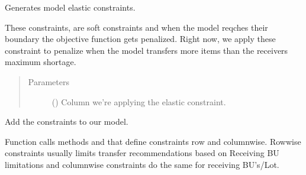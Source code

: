 \documentclass[letterpaper,10pt,english]{sphinxmanual}
\begin{document}
\begin{fulllineitems}
\begin{fulllineitems}
\end{fulllineitems}


\begin{fulllineitems}
\label{\detokenize{source/optimization.model:optimization.model.optimizer.OptimizationModel._create_elastic_constraints}}
Generates model elastic constraints.

These constraints, are soft constraints and when the model reqches their boundary
the objective function gets penalized. Right now, we apply these constraint to penalize
when the model transfers more items than the receivers maximum shortage.
\begin{quote}\begin{description}
\item[{Parameters}] \leavevmode
{} () \textendash{} Column we’re applying the elastic constraint.

\end{description}\end{quote}

\end{fulllineitems}


\begin{fulllineitems}
\label{\detokenize{source/optimization.model:optimization.model.optimizer.OptimizationModel._create_main_constraints}}
Add the constraints to our model.

Function calls methods  and 
that define constraints row and column\sphinxhyphen{}wise. Row\sphinxhyphen{}wise constraints usually
limits transfer recommendations based on Receiving BU limitations and column\sphinxhyphen{}wise
constraints do the same for receiving BU’s/Lot.


\end{fulllineitems}
\end{fulllineitems}
\end{document}
